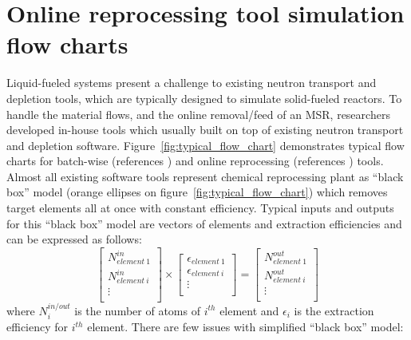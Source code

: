\section{Online reprocessing tool simulation flow charts}
Liquid-fueled systems present a challenge to existing neutron transport 
and depletion tools, which are typically designed to simulate 
solid-fueled reactors. To handle the material flows, and the online 
removal/feed of an \gls{MSR}, researchers developed in-house 
tools which usually built on top of existing neutron transport and 
depletion software. Figure~\ref{fig:typical_flow_chart} demonstrates typical 
flow charts for batch-wise (references \cite{betzler_molten_2017,
li_optimization_2018,rykhlevskii_modeling_2019,zhou_fuel_2018-1,
sheu_depletion_2013,park_whole_2015}) and 
online reprocessing (references \cite{heuer_simulation_2010,
doligez_coupled_2014,  heuer_towards_2014, fiorina_investigation_2013,
nuttin_potential_2005, aufiero_extended_2013,
de_troullioud_de_lanversin_toward_2017}) tools. Almost all existing 
software tools represent chemical reprocessing plant as ``black box'' 
model (orange ellipses on figure~\ref{fig:typical_flow_chart}) which 
removes target 
elements all at once with constant efficiency. Typical inputs and outputs 
for this ``black box'' model are vectors of elements and extraction 
efficiencies and can be 
expressed as follows:
\begin{equation}
\begin{bmatrix}
N^{in}_{element \: 1} \\ N^{in}_{element \: i} \\ \vdots \\
\end{bmatrix} 
\times
\begin{bmatrix}
\epsilon_{element \: 1} \\ \epsilon_{element \: i} \\ \vdots \\
\end{bmatrix} =
\begin{bmatrix}
N^{out}_{element \: 1} \\ N^{out}_{element \: i} \\ \vdots \\
\end{bmatrix}
\end{equation}
where $N^{in/out}_i$ is the number of atoms of $i^{th}$ element and 
$\epsilon_i$ is the 
extraction efficiency for $i^{th}$ element. There are few issues with 
simplified ``black box'' model: 
